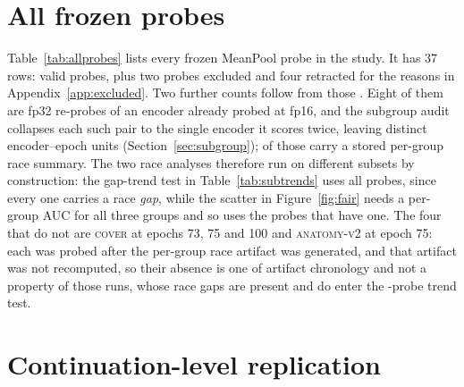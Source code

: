 \documentclass{article}
\begin{document}



\appendix

\section{All frozen probes}
\label{app:allprobes}

Table~\ref{tab:allprobes} lists every frozen MeanPool probe in the study. It has
37 rows: \Nprobes{} valid probes, plus two probes excluded and four retracted
for the reasons in Appendix~\ref{app:excluded}. Two further counts follow from
those \Nprobes{}. Eight of them are fp32 re-probes of an encoder already probed
at fp16, and the subgroup audit collapses each such pair to the single encoder it
scores twice, leaving \NprobesSub{} distinct encoder--epoch units
(Section~\ref{sec:subgroup}); \NprobesRace{} of those carry a stored per-group
race summary. The two race analyses therefore run on
different subsets by construction: the gap-trend test in
Table~\ref{tab:subtrends} uses all \NprobesSub{} probes, since every one carries
a race \emph{gap}, while the scatter in Figure~\ref{fig:fair} needs a per-group
AUC for all three groups and so uses the \NprobesRace{} probes that have one.
The four that do not are \textsc{cover} at epochs 73, 75 and 100 and
\textsc{anatomy-v2} at epoch 75: each was probed after the per-group race
artifact was generated, and that artifact was not recomputed, so their absence
is one of artifact chronology and not a property of those runs, whose race gaps
are present and do enter the \NprobesSub{}-probe trend test.

\begin{table}[h]
\centering
\caption{Every frozen probe in the study, including runs excluded from the
analysis and the reasons. The probe protocol is otherwise the same for every
row (FairVision test $N{=}\Ntest$, seed 42, frozen encoder, MeanPool +
LayerNorm + Linear) and differs only in the precision column.
``Precision'' is the probe-time
numerical precision, inferred from the stored prediction dtype, and is distinct
from the pretraining target precision discussed in
Appendix~\ref{app:excluded}.}
\label{tab:allprobes}
\footnotesize

\end{table}

\section{Continuation-level replication}
\label{app:replication}
\end{document}
